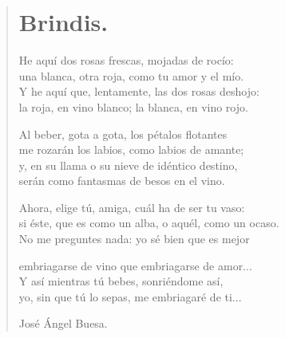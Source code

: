 \documentclass[11pt, portrait, twoside, notitlepage, openright]{book}
\begin{document}
\newpage
\begin{verse}
\begin{center}
\section{Brindis.}
\end{center}
He aquí dos rosas frescas, mojadas de rocío:\\
una blanca, otra roja, como tu amor y el mío.\\
Y he aquí que, lentamente, las dos rosas deshojo:\\
la roja, en vino blanco; la blanca, en vino rojo.
\newline

Al beber, gota a gota, los pétalos flotantes\\
me rozarán los labios, como labios de amante;\\
y, en su llama o su nieve de idéntico destino,\\
serán como fantasmas de besos en el vino.
\newline

Ahora, elige tú, amiga, cuál ha de ser tu vaso:\\
si éste, que es como un alba, o aquél, como un ocaso.\\
No me preguntes nada: yo sé bien que es mejor
\newline

embriagarse de vino que embriagarse de amor...\\
Y así mientras tú bebes, sonriéndome así,\\
yo, sin que tú lo sepas, me embriagaré de ti...
\newline

\begin{flushright}
José Ángel Buesa.
\end{flushright}
\end{verse}
\newpage
\end{document}
